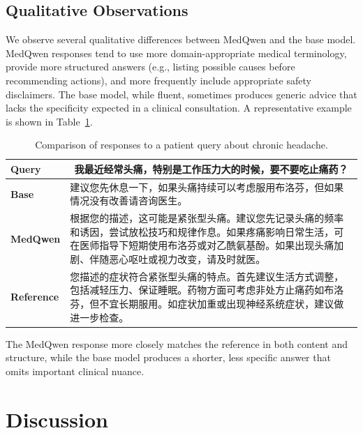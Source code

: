\documentclass[12pt,a4paper]{article}
\begin{document}
\subsection{Qualitative Observations}

We observe several qualitative differences between MedQwen and the base model. MedQwen responses tend to use more domain-appropriate medical terminology, provide more structured answers (e.g., listing possible causes before recommending actions), and more frequently include appropriate safety disclaimers. The base model, while fluent, sometimes produces generic advice that lacks the specificity expected in a clinical consultation. A representative example is shown in Table~\ref{tab:qualitative}.

\begin{table}[ht]
\centering
\caption{Comparison of responses to a patient query about chronic headache.}
\label{tab:qualitative}
\begin{tabular}{p{2.2cm}p{11.5cm}}
\toprule
\textbf{Query} & \multicolumn{1}{c}{\textbf{我最近经常头痛，特别是工作压力大的时候，要不要吃止痛药？}} \\
\midrule
\textbf{Base} & 建议您先休息一下，如果头痛持续可以考虑服用布洛芬，但如果情况没有改善请咨询医生。 \\
\midrule
\textbf{MedQwen} & 根据您的描述，这可能是紧张型头痛。建议您先记录头痛的频率和诱因，尝试放松技巧和规律作息。如果疼痛影响日常生活，可在医师指导下短期使用布洛芬或对乙酰氨基酚。如果出现头痛加剧、伴随恶心呕吐或视力改变，请及时就医。 \\
\midrule
\textbf{Reference} & 您描述的症状符合紧张型头痛的特点。首先建议生活方式调整，包括减轻压力、保证睡眠。药物方面可考虑非处方止痛药如布洛芬，但不宜长期服用。如症状加重或出现神经系统症状，建议做进一步检查。 \\
\bottomrule
\end{tabular}
\end{table}

The MedQwen response more closely matches the reference in both content and structure, while the base model produces a shorter, less specific answer that omits important clinical nuance.

\section{Discussion}
\label{sec:discussion}
\end{document}
